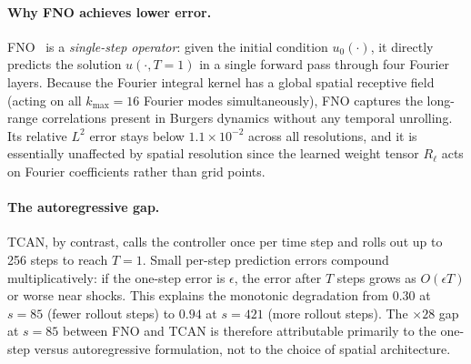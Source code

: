 \paragraph{Why FNO achieves lower error.}
FNO~\cite{li2021fourier} is a \emph{single-step operator}: given the initial condition $u_0(\cdot)$, it directly predicts the solution $u(\cdot, T=1)$ in a single forward pass through four Fourier layers. Because the Fourier integral kernel has a global spatial receptive field (acting on all $k_{\max}=16$ Fourier modes simultaneously), FNO captures the long-range correlations present in Burgers dynamics without any temporal unrolling. Its relative $L^2$ error stays below $1.1 \times 10^{-2}$ across all resolutions, and it is essentially unaffected by spatial resolution since the learned weight tensor $R_\ell$ acts on Fourier coefficients rather than grid points.

\paragraph{The autoregressive gap.}
TCAN, by contrast, calls the controller once per time step and rolls out up to 256 steps to reach $T=1$. Small per-step prediction errors compound multiplicatively: if the one-step error is $\epsilon$, the error after $T$ steps grows as $O(\epsilon T)$ or worse near shocks. This explains the monotonic degradation from $0.30$ at $s=85$ (fewer rollout steps) to $0.94$ at $s=421$ (more rollout steps). The $\times 28$ gap at $s=85$ between FNO and TCAN is therefore attributable primarily to the one-step versus autoregressive formulation, not to the choice of spatial architecture.